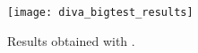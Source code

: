 \begin{figure}[H]
\centering 
\texttt{[image: diva\_bigtest\_results]}
\caption{Results obtained with .\label{fig:diva_bigtest_results}}
\end{figure}



%
%
%
%
%
%
%
%
%
%
%
%

